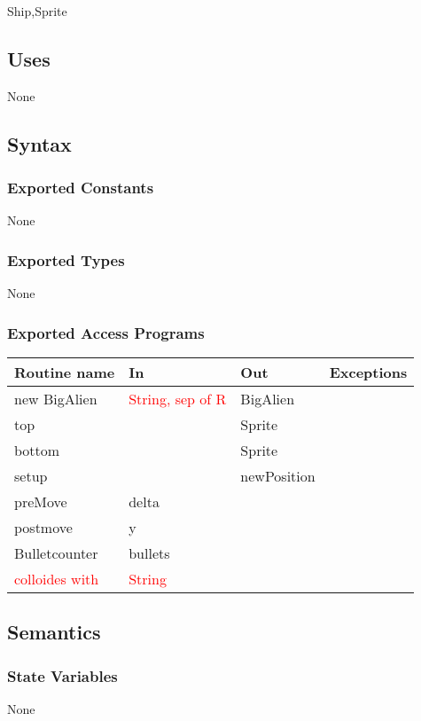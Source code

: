 \documentclass[12pt]{article}
\begin{document}
Ship,Sprite

\subsection* {Uses}

None

\subsection* {Syntax}

\subsubsection* {Exported Constants}

None

\subsubsection* {Exported Types}

None 

\subsubsection* {Exported Access Programs}

\begin{tabular}{| l | l | l | p{5cm} |}
\hline
\textbf{Routine name} & \textbf{In} & \textbf{Out} & \textbf{Exceptions}\\
\hline
new BigAlien & \textcolor{red}{String, sep of R} & BigAlien  & ~\\
\hline
top & ~ & Sprite & ~\\
\hline
bottom & ~ & Sprite  & ~\\
\hline
setup & ~ & newPosition & ~ \\
\hline
preMove & delta & ~ & ~\\
\hline
postmove & y & ~ & ~\\
\hline
Bulletcounter & bullets & ~ & ~\\
\hline
\textcolor{red}{colloides with} & \textcolor{red}{String} &  ~ & ~\\
\end{tabular}

\subsection* {Semantics}

\subsubsection* {State Variables}
None
\end{document}
